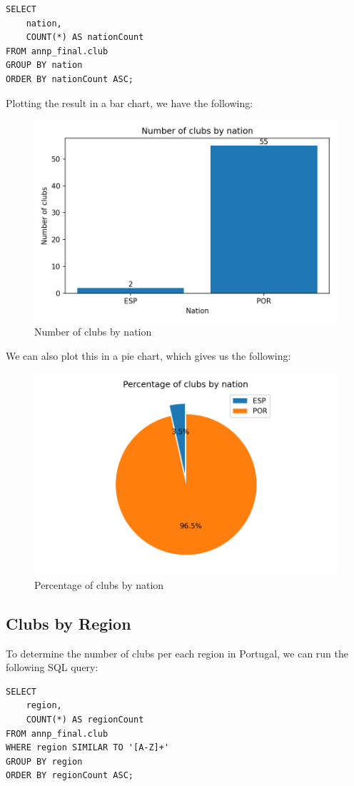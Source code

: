 \documentclass[a4paper, 11pt]{article}
\begin{document}
\begin{verbatim}
SELECT
    nation,
    COUNT(*) AS nationCount
FROM annp_final.club
GROUP BY nation
ORDER BY nationCount ASC;
\end{verbatim}

Plotting the result in a bar chart, we have the following:

\begin{figure}[H]
    \centering
    \includegraphics[width=.6\textwidth]{img/clubsbynation}
    \caption{Number of clubs by nation}
    \label{fig:clubs-by-nation}
\end{figure}

We can also plot this in a pie chart, which gives us the following:

\begin{figure}[H]
    \centering
    \includegraphics[width=.65\textwidth]{img/clubsbynation-pie}
    \caption{Percentage of clubs by nation}
    \label{fig:clubs-by-nation-pie}
\end{figure}

\subsection{Clubs by Region}

To determine the number of clubs per each region in Portugal, we can run the following SQL query:

\begin{verbatim}
SELECT 
    region,
    COUNT(*) AS regionCount
FROM annp_final.club
WHERE region SIMILAR TO '[A-Z]+'
GROUP BY region
ORDER BY regionCount ASC;
\end{verbatim}
\end{document}
